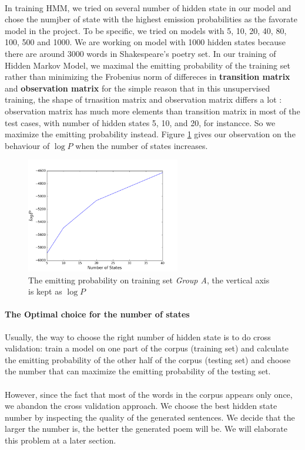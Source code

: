 %
\paragraph{}
In training HMM, we tried on several number of hidden state in our model and chose the numjber of state with the highest emission probabilities as the favorate model in the project. To be specific, we tried on models with 5, 10, 20, 40, 80, 100, 500 and 1000. We are working on model with 1000 hidden states because there are around 3000 words in Shakespeare's poetry set. In our training of Hidden Markov Model,  we maximal the emitting probability of the training set rather than minimizing the Frobenius norm of differeces in \textbf{transition matrix} and \textbf{observation matrix} for the simple reason that in this unsupervised training, the shape of trnasition matrix and observation matrix differs a lot : observation matrix has much more elements than transition matrix in most of the test cases, with number of hidden states 5, 10, and 20, for
instancce. So we maximize the emitting probability instead. Figure \ref{fig:probability} gives our observation on the behaviour of $\log P$ when the number of states increases.
 \begin{figure}[h!]
 \centering
 \includegraphics[width=0.6\textwidth]{./figure/probability.png}
 \caption{The emitting probability on training set \textit{Group A}, the vertical axis is kept as $\log P$\label{fig:probability}}
 \end{figure}
\paragraph{The Optimal choice for the number of states} Usually, the way to choose the right number of hidden state is to do cross validation: train a model on one part of the corpus (training set) and calculate the emitting probability of the other half of the corpus (testing set) and choose the number that can maximize the emitting probability of the testing set.

\paragraph{}
However, since the fact that most of the words in the corpus appears only once, we abandon the cross validation approach. We choose the best hidden state number by inspecting the quality of the generated sentences. We decide that the larger the number is, the better the generated poem will be. We will elaborate this problem at a later section. 
